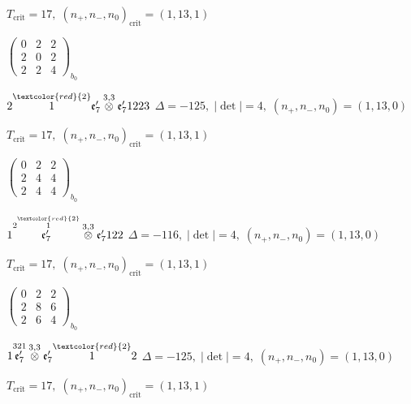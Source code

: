 \documentclass[10pt]{article}
\begin{document}
\hspace{1em}$T_{\text{crit}}=17,\; (n_+,n_-,n_0)_{\text{crit}}=(1,13,1)$

\hspace{2em}$\left(\begin{smallmatrix}0 & 2 & 2 \\ 2 & 0 & 2 \\ 2 & 2 & 4\end{smallmatrix}\right)_{\!b_0}$

\smallskip

$2\overset{\textcolor{red}{2}}{1}\mathfrak{e}_7'\overset{3,3}{\otimes}\mathfrak{e}_7'1223$ \quad $\Delta=-125,\; |\det|=4,\; (n_+,n_-,n_0)=(1,13,0)$

\hspace{1em}$T_{\text{crit}}=17,\; (n_+,n_-,n_0)_{\text{crit}}=(1,13,1)$

\hspace{2em}$\left(\begin{smallmatrix}0 & 2 & 2 \\ 2 & 4 & 4 \\ 2 & 4 & 4\end{smallmatrix}\right)_{\!b_0}$

\smallskip

$1\overset{2\overset{\textcolor{red}{2}}{1}}{\mathfrak{e}_7'}\overset{3,3}{\otimes}\mathfrak{e}_7'122$ \quad $\Delta=-116,\; |\det|=4,\; (n_+,n_-,n_0)=(1,13,0)$

\hspace{1em}$T_{\text{crit}}=17,\; (n_+,n_-,n_0)_{\text{crit}}=(1,13,1)$

\hspace{2em}$\left(\begin{smallmatrix}0 & 2 & 2 \\ 2 & 8 & 6 \\ 2 & 6 & 4\end{smallmatrix}\right)_{\!b_0}$

\smallskip

$1\overset{321}{\mathfrak{e}_7'}\overset{3,3}{\otimes}\mathfrak{e}_7'\overset{\textcolor{red}{2}}{1}2$ \quad $\Delta=-125,\; |\det|=4,\; (n_+,n_-,n_0)=(1,13,0)$

\hspace{1em}$T_{\text{crit}}=17,\; (n_+,n_-,n_0)_{\text{crit}}=(1,13,1)$
\end{document}
